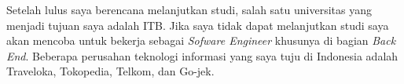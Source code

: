 \documentclass[a4paper,oneside,final,notitlepage,onecolumn,12pt]{article}%
\begin{document}
Setelah lulus saya berencana melanjutkan studi, salah satu universitas yang menjadi tujuan saya adalah ITB.  Jika saya tidak dapat melanjutkan studi saya akan mencoba untuk bekerja sebagai \textit{Sofware Engineer} khusunya di bagian \textit{Back End}. Beberapa perusahan teknologi informasi yang saya tuju di Indonesia adalah Traveloka, Tokopedia, Telkom, dan Go-jek.
\end{document}
